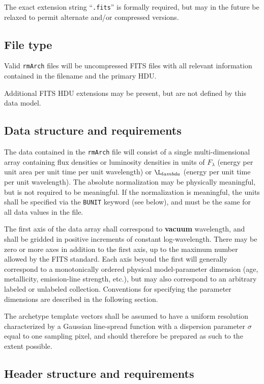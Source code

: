 \documentclass[12pt]{article}
\begin{document}
The exact extension string ``\texttt{.fits}'' is formally required,
but may in the future be relaxed to permit alternate and/or
compressed versions.

\subsection{File type}

Valid \texttt{rmArch} files will be uncompressed FITS
files with all relevant information contained in the
filename and the primary HDU\@.

Additional FITS HDU extensions may be present, but are not defined
by this data model.

\subsection{Data structure and requirements}

The data contained in the \texttt{rmArch} file
will consist of a single multi-dimensional array
containing flux densities or luminosity densities in units of
$F_{\lambda}$ (energy per unit area per unit
time per unit wavelength) or $\L_{lambda}$
(energy per unit time per unit wavelength).
The absolute normalization may be physically
meaningful, but is not required to be meaningful.
If the normalization is meaningful, the units
shall be specified via the \texttt{BUNIT} keyword (see below),
and must be the same for all data values in the file.

The first axis of the data array shall correspond to \textbf{vacuum}
wavelength, and shall be gridded in positive increments of constant
log-wavelength.  There may be zero or more axes in addition
to the first axis, up to the maximum number allowed by
the FITS standard.  Each axis beyond the first will generally correspond
to a monotonically ordered
physical model-parameter dimension (age, metallicity,
emission-line strength, etc.), but may also correspond to
an arbitrary labeled or unlabeled collection.
Conventions for specifying the parameter dimensions are
described in the following section.

The archetype template vectors shall be assumed to have
a uniform resolution characterized by a Gaussian
line-spread function with a dispersion parameter
$\sigma$ equal to one sampling pixel, and should therefore be
prepared as such to the extent possible.

\subsection{Header structure and requirements}
\end{document}
